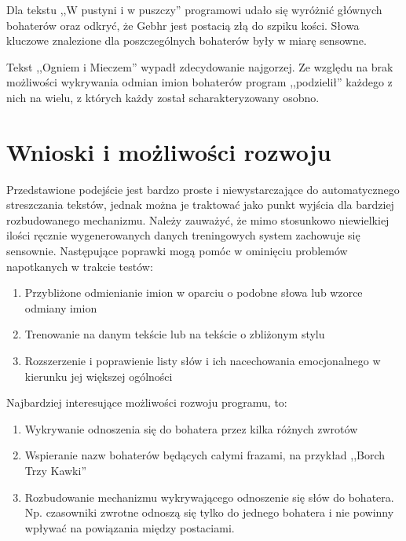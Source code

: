 \documentclass[10pt,a4paper]{article}
\begin{document}
		Dla tekstu ,,W pustyni i w puszczy'' programowi udało się wyróżnić głównych bohaterów oraz odkryć, że Gebhr jest postacią złą do szpiku kości. Słowa kluczowe znalezione dla poszczególnych bohaterów były w miarę sensowne.

		Tekst ,,Ogniem i Mieczem'' wypadł zdecydowanie najgorzej. Ze względu na brak możliwości wykrywania odmian imion bohaterów program ,,podzielił'' każdego z nich na wielu, z których każdy został scharakteryzowany osobno.

\section{Wnioski i możliwości rozwoju}

	Przedstawione podejście jest bardzo proste i niewystarczające do automatycznego streszczania tekstów, jednak można je traktować jako punkt wyjścia dla bardziej rozbudowanego mechanizmu. Należy zauważyć, że mimo stosunkowo niewielkiej ilości ręcznie wygenerowanych danych treningowych system zachowuje się sensownie. Następujące poprawki mogą pomóc w ominięciu problemów napotkanych w trakcie testów:

\begin{enumerate}
	\item Przybliżone odmienianie imion w oparciu o podobne słowa lub wzorce odmiany imion
	\item Trenowanie na danym tekście lub na tekście o zbliżonym stylu
	\item Rozszerzenie i poprawienie listy słów i ich nacechowania emocjonalnego w kierunku jej większej ogólności
\end{enumerate}

	Najbardziej interesujące możliwości rozwoju programu, to:

\begin{enumerate}
	\item Wykrywanie odnoszenia się do bohatera przez kilka różnych zwrotów
	\item Wspieranie nazw bohaterów będących całymi frazami, na przykład ,,Borch Trzy Kawki''
	\item Rozbudowanie mechanizmu wykrywającego odnoszenie się słów do bohatera. Np. czasowniki zwrotne odnoszą się tylko do jednego bohatera i nie powinny wpływać na powiązania między postaciami.
\end{enumerate}
\end{document}
